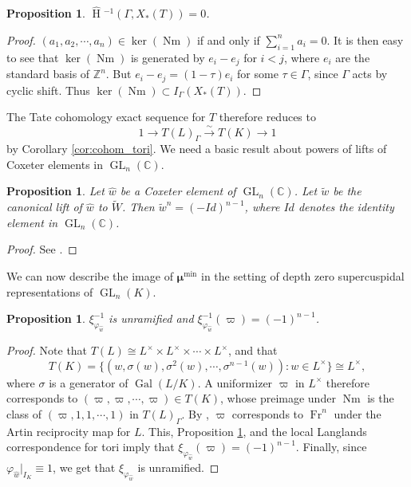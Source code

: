 \documentclass[11pt]{amsart}
\theoremstyle{plain}
\newtheorem{proposition}[theorem]{Proposition}
\newcommand{\HT}[1]{\hat{\HH}{}^{#1}}
\theoremstyle{definition}
\DeclareMathOperator{\Gal}{Gal}
\DeclareMathOperator{\HH}{H}
\DeclareMathOperator{\Nm}{Nm}
\DeclareMathOperator{\Fr}{Fr}
\DeclareMathOperator{\GL}{GL}
\newcommand{\CC}{\mathbb{C}}
\newcommand{\Lx}{L^\times}
\newcommand{\bmu}{\boldsymbol\mu}
\newcommand{\mumin}{\bmu^{\min}}
\begin{document}
\begin{proposition}
$\HT{-1}(\Gamma, X_*(T)) = 0$.
\end{proposition}

\begin{proof}
$(a_1, a_2, \cdots, a_n) \in \ker(\Nm)$ if and only if $\displaystyle\sum_{i=1}^n a_i = 0$.
It is then easy to see that $\ker(\Nm)$ is generated by $e_i - e_j$ for $i < j$, where
$e_i$ are the standard basis of $\mathbb{Z}^n$.  But $e_i - e_j = (1 - \tau)e_i$ for some
$\tau \in \Gamma$, since $\Gamma$ acts by cyclic shift.  Thus $\ker(\Nm) \subset I_{\Gamma}(X_*(T))$.
\end{proof}

The Tate cohomology exact sequence for $T$ therefore reduces to
$$1 \rightarrow T(L)_{\Gamma} \xrightarrow{\sim} T(K) \rightarrow 1$$ by
Corollary \ref{cor:cohom_tori}.  We need a basic result about powers of lifts
of Coxeter elements in $\GL_{n}(\CC)$.

\begin{proposition}\label{prop:powers_of_lifts}
Let $\hat{w}$ be a Coxeter element of $\GL_{n}(\CC)$.  Let $\tilde{w}$ be the
canonical lift of $\hat{w}$ to $\widetilde{W}$. Then $\tilde{w}^n = (-Id)^{n-1}$, where $Id$
denotes the identity element in $\GL_{n}(\CC)$.
\end{proposition}

\begin{proof}
See \cite[\S3.1]{zaremsky:ppa}.
\end{proof}

We can now describe the image of $\mumin$ in the setting of
depth zero supercuspidal representations of $\GL_{n}(K)$.

\begin{proposition} \label{prop:rectifier_agreement}
$\xi_{\varphi_{\hat{w}}}^{-1}$ is unramified and
$\xi_{\varphi_{\hat{w}}}^{-1}(\varpi) = (-1)^{n-1}$.
\end{proposition}

\begin{proof}
Note that $T(L) \cong \Lx \times \Lx \times \cdots \times \Lx$, and
that $$T(K) = \{(w, \sigma(w), \sigma^2(w), \cdots, \sigma^{n-1}(w)) : w \in \Lx \} \cong \Lx,$$ where
$\sigma$ is a generator of $\Gal(L/K)$.  A uniformizer $\varpi$ in $\Lx$
therefore corresponds to $(\varpi, \varpi, \cdots, \varpi) \in T(K)$, whose
preimage under $\Nm$ is the class of $(\varpi, 1, 1, \cdots, 1)$ in $T(L)_{\Gamma}$.
By \cite[\S 2.4]{serre:LocalClassFieldThy}, $\varpi$ corresponds to $\Fr^n$ under the Artin
reciprocity map for $L$.  This, Proposition \ref{prop:powers_of_lifts},
and the local Langlands correspondence for tori imply that
$\xi_{\varphi_{\hat{w}}}(\varpi) = (-1)^{n-1}$.
Finally, since $\varphi_{\hat{w}}|_{I_K} \equiv 1$, we get that $\xi_{\varphi_{\hat{w}}}$ is
unramified.
\end{proof}
\end{document}
